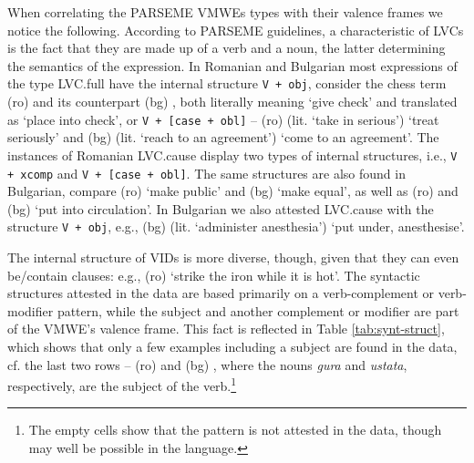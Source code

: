 \documentclass[output=paper,colorlinks,citecolor=brown]{langscibook}
\begin{document}

When correlating the PARSEME VMWEs types with their valence frames we notice the following. 
According to PARSEME guidelines, a characteristic of LVCs is the fact that they are made up of a verb and a noun, the latter determining the semantics of the expression. 
In Romanian and Bulgarian most expressions of the type LVC.full have the internal structure \texttt{V + obj}, consider the chess term (ro)  and its counterpart (bg) , both literally meaning `give check' and translated as `place into check', or \texttt{V + [case + obl]} -- (ro)  (lit. `take in serious') {`treat seriously'} and (bg)  (lit. `reach to an agreement') {`come to an agreement'}. %
The instances of Romanian LVC.cause display two types of internal structures, i.e., \texttt{V + xcomp} and \texttt{V + [case + obl]}. The same structures are also found in Bulgarian, compare (ro)  {`make public'}
and (bg)  {`make equal'}, 
as well as (ro) 
and (bg) 
{`put into circulation'}. In Bulgarian we also attested LVC.cause with the structure \texttt{V + obj}, e.g., (bg)  (lit. `administer anesthesia') {`put under, anesthesise'}.
 

The internal structure of VIDs is more diverse, though, given that they can even be/contain clauses: e.g., (ro)  {`strike the iron while it is hot'}. 
The syntactic structures attested in the data are based primarily on a verb-complement or verb-modifier pattern, while the subject and another complement or modifier are part of the VMWE's valence frame. This fact is reflected in Table \ref{tab:synt-struct}, %
which shows that only a few examples including a subject are found in the data, cf. the last two rows -- (ro)  and (bg) , 
where the nouns \textit{gura} and \textit{ustata}, respectively, are the subject of the verb.\footnote{The empty cells show that the pattern is not attested in the data, though may well be possible in the language.} 
\end{document}
